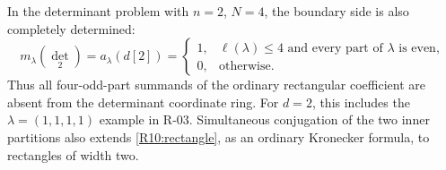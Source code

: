 In the determinant problem with $n=2$, $N=4$, the boundary side is
also completely determined:
\begin{equation}\label{R10:closure}
m_\lambda(\det_2)=a_\lambda(d[2])=
\begin{cases}
1,&\ell(\lambda)\leq4\text{ and every part of }\lambda\text{ is even},\\
0,&\text{otherwise}.
\end{cases}
\end{equation}
Thus all four-odd-part summands of the ordinary rectangular
coefficient are absent from the determinant coordinate ring.
For $d=2$, this includes the $\lambda=(1,1,1,1)$ example in R-03.
Simultaneous conjugation of the two inner partitions also extends
\eqref{R10:rectangle}, as an ordinary Kronecker formula, to rectangles
of width two.

